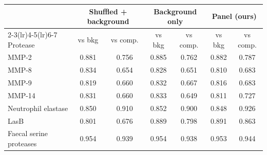\begin{tabular}{@{}lcccccc@{}}\toprule
 & \multicolumn{2}{c}{Shuffled + background} & \multicolumn{2}{c}{Background only} & \multicolumn{2}{c}{Panel (ours)} \\
\cmidrule(lr){2-3}\cmidrule(lr){4-5}\cmidrule(lr){6-7}
Protease & vs bkg & vs comp. & vs bkg & vs comp. & vs bkg & vs comp. \\\midrule
MMP-2 & 0.881 & 0.756 & 0.885 & 0.762 & 0.882 & 0.787 \\
MMP-8 & 0.834 & 0.654 & 0.828 & 0.651 & 0.810 & 0.683 \\
MMP-9 & 0.819 & 0.660 & 0.832 & 0.667 & 0.816 & 0.683 \\
MMP-14 & 0.831 & 0.660 & 0.833 & 0.649 & 0.811 & 0.727 \\
Neutrophil elastase & 0.850 & 0.910 & 0.852 & 0.900 & 0.848 & 0.926 \\
LasB & 0.801 & 0.676 & 0.889 & 0.798 & 0.891 & 0.863 \\
Faecal serine proteases & 0.954 & 0.939 & 0.954 & 0.938 & 0.953 & 0.944 \\
\bottomrule\end{tabular}
